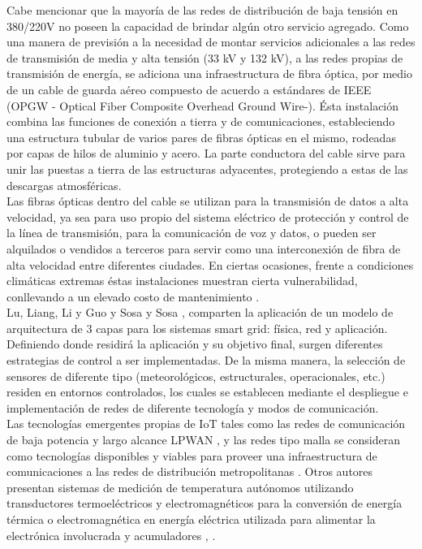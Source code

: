 Cabe mencionar que la mayoría de las redes de distribución de baja tensión en 380/220V no poseen la capacidad de brindar algún otro servicio agregado. Como una manera de previsión a la necesidad de montar servicios adicionales a las redes de transmisión de media y alta tensión (33 kV y 132 kV), a las redes propias de transmisión de energía, se adiciona una infraestructura de fibra óptica, por medio de un cable de guarda aéreo compuesto de acuerdo a estándares de IEEE (OPGW - Optical Fiber Composite Overhead Ground Wire-). Ésta instalación combina las funciones de conexión a tierra y de comunicaciones, estableciendo una estructura tubular de varios pares de fibras ópticas en el mismo, rodeadas por capas de hilos de aluminio y acero. La parte conductora del cable sirve para unir las puestas a tierra de las estructuras adyacentes, protegiendo a estas de las descargas atmosféricas.\\
Las fibras ópticas dentro del cable se utilizan para la transmisión de datos a alta velocidad, ya sea para uso propio del sistema eléctrico de protección y control de la línea de transmisión, para la comunicación de voz y datos, o pueden ser alquilados o vendidos a terceros para servir como una interconexión de fibra de alta velocidad entre diferentes ciudades. En ciertas ocasiones, frente a condiciones climáticas extremas éstas instalaciones muestran cierta vulnerabilidad, conllevando a un elevado costo de mantenimiento \citep{ARTICLE:1}.\\
Lu, Liang, Li y Guo \citep{ARTICLE:1} y Sosa y Sosa \citep{ARTICLE:2}, comparten la aplicación de un modelo de arquitectura de 3 capas para los sistemas smart grid: física, red y aplicación. Definiendo donde residirá la aplicación y su objetivo final, surgen diferentes estrategias de control a ser implementadas. De la misma manera, la selección de sensores de diferente tipo (meteorológicos, estructurales, operacionales, etc.) residen en entornos controlados, los cuales se establecen mediante el despliegue e implementación de redes de diferente tecnología y modos de comunicación.\\
Las tecnologías emergentes propias de IoT tales como las redes de comunicación de baja potencia y largo alcance LPWAN \citep{rfc8376}, y las redes tipo malla se consideran como tecnologías disponibles y viables para proveer una infraestructura de comunicaciones a las redes de distribución metropolitanas  \citep{ARTICLE:4}. Otros autores presentan sistemas de medición de temperatura autónomos utilizando transductores termoeléctricos y electromagnéticos para la conversión de energía térmica o electromagnética en energía eléctrica utilizada para alimentar la electrónica involucrada y acumuladores \citep{ARTICLE:5}, \citep{Hua}.

